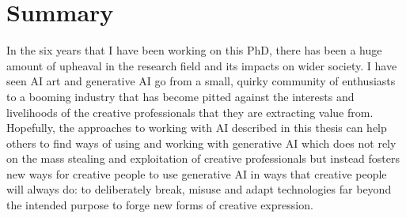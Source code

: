 \section{Summary}

In the six years that I have been working on this PhD, there has been a huge amount of upheaval in the research field and its impacts on wider society. 
I have seen AI art and generative AI go from a small, quirky community of enthusiasts to a booming industry that has become pitted against the interests and livelihoods of the creative professionals that they are extracting value from.
Hopefully, the approaches to working with AI described in this thesis can help others to find ways of using and working with generative AI which does not rely on the mass stealing and exploitation of creative professionals but instead fosters new ways for creative people to use generative AI in ways that creative people will always do: to deliberately break, misuse and adapt technologies far beyond the intended purpose to forge new forms of creative expression.
